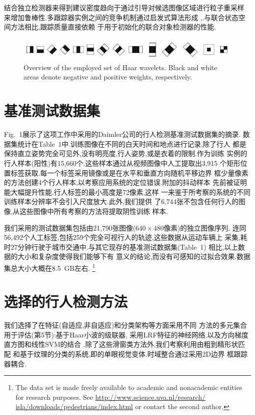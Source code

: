 \documentclass[10pt,letterpaper,journal,compsoc]{IEEEtran}
\begin{document}
结合独立检测器来得到建议密度趋向于通过引导对候选图像区域进行粒子重采样
来增加鲁棒性.多跟踪器实例之间的竞争机制通过启发式算法形成
\cite{bib35},\cite{bib50}.与联合状态空间方法相比,跟踪质量直接依赖
于用于初始化的联合对象检测器的性能.
\begin{figure}[!t]
\centering
\includegraphics[width=5in]{fig2.JPG}
\caption{Overview of the employed set of Haar wavelets. Black and white areas denote negative and positive weights, respectively.}
\end{figure}
\section{基准测试数据集}
Fig.~1展示了这项工作中采用的Daimler公司的行人检测基准测试数据集的摘录.
数据集统计在Table~1中.训练图像在不同的白天时间和地点进行记录,除了行人
都是保持直立姿势完全可见外,没有明亮度,行人姿势,或是衣着的限制.作为训练
实例的行人样本(阳性)有15,660个.这些样本通过从视频图像中人工提取出3,915
个矩形位置标签获取.每一个标签采用镜像或是在水平和垂直方向随机平移边界
框少量像素的方法创建4个行人样本,以考察应用系统的定位错误.附加的抖动样本
先前被证明能大幅提升性能\cite{bib14}.行人标签的最小高度是72像素,这样
一来鉴于所考察的系统的不同训练样本分辨率不会引入尺度放大.此外,我们提供
了6,744张不包含任何行人的图像,从这些图像中所有考察的方法将提取阴性训练
样本.

我们采用的测试数据集包括由21,790张图像($640\times480$像素)的独立图像序列,
连同56,492个人工标签,包括259个完全可视行人的轨迹,这些数据从运动车辆上
采集,耗时27分钟行驶于城市交通中.与其它现存的基准测试数据集(Table~1)
相比,以上数据的大小和复杂度使得我们能够下有
意义的结论,而没有可感知的过拟合效果.数据集总大小大概在8.5~GB左右.
\footnote{The data set is made freely available to academic and nonacademic
entities for research purposes. See \url{http://www.science.uva.nl/research/
isla/downloads/pedestrians/index.html} or contact the second author.}
\section{选择的行人检测方法}

我们选择了在特征(自适应,非自适应)和分类架构等方面采用不同
方法的多元集合用于评估(第5节):基于Haar小波的级联器\cite{bib74},
采用LRF特征的神经网络\cite{bib75},以及方向梯度直方图和线性SVM的结合
\cite{bib11}.除了这些滑窗类方法外,我们考察利用由粗到精形状匹配
和基于纹理的分类的系统,即\cite{bib23}的单眼视觉变体.时域整合通过采用2D边界
框跟踪器耦合.
\end{document}
